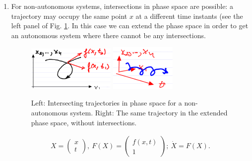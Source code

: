 \begin{enumerate}
	\item For non-autonomous systems, intersections in phase space are possible: a trajectory may occupy the same point $x$ at a different time instants (see the left panel of Fig. \ref{fig:automization}. In this case we can extend the phase space in order to get an autonomous system where there cannot be any intersections.
		\begin{figure}[h!]
			\centering
			\includegraphics[width=0.4\textwidth]{figures/ch1/4intersecting_trajectories.png}
			\hspace{0.05\textwidth}
			\includegraphics[width=0.3\textwidth]{figures/ch1/5extended_space.png}
			\caption{Left: Intersecting trajectories in phase space for a non-autonomous system. Right: The same trajectory in the extended phase space, without intersections.}
			\label{fig:automization}
		\end{figure}
		\begin{align}
			 {X} = 
			\begin{pmatrix}
				 {x} \\ t
			\end{pmatrix},\
			F( {X}) = 
			\begin{pmatrix}
				f( {x},t) \\ 1
			\end{pmatrix};\
			\dot{ {X}} = F( {X}).
		\end{align}
\end{enumerate}

